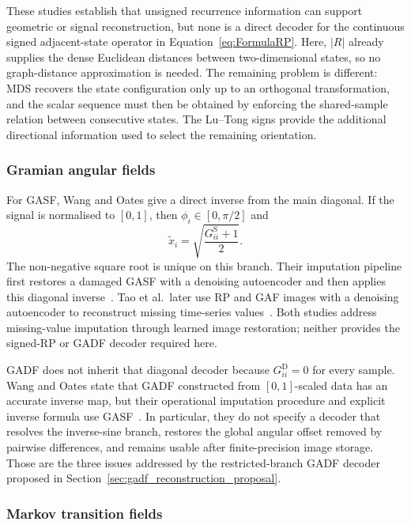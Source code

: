 \documentclass[preprint,12pt]{elsarticle}
\begin{document}
These studies establish that unsigned recurrence information can support geometric or signal reconstruction, but none is a direct decoder for the continuous signed adjacent-state operator in Equation~\ref{eq:FormulaRP}. Here, \(\lvert R\rvert\) already supplies the dense Euclidean distances between two-dimensional states, so no graph-distance approximation is needed. The remaining problem is different: MDS recovers the state configuration only up to an orthogonal transformation, and the scalar sequence must then be obtained by enforcing the shared-sample relation between consecutive states. The Lu--Tong signs provide the additional directional information used to select the remaining orientation.

\subsubsection{Gramian angular fields}

For GASF, Wang and Oates give a direct inverse from the main diagonal. If the signal is normalised to \([0,1]\), then \(\phi_i\in[0,\pi/2]\) and
\[
\tilde{x}_i=\sqrt{\frac{G^{\mathrm{S}}_{ii}+1}{2}}.
\]
The non-negative square root is unique on this branch. Their imputation pipeline first restores a damaged GASF with a denoising autoencoder and then applies this diagonal inverse~\cite{wang2015encoding}. Tao et al.\ later use RP and GAF images with a denoising autoencoder to reconstruct missing time-series values~\cite{huamin2020reconstruction}. Both studies address missing-value imputation through learned image restoration; neither provides the signed-RP or GADF decoder required here.

GADF does not inherit that diagonal decoder because \(G^{\mathrm{D}}_{ii}=0\) for every sample. Wang and Oates state that GADF constructed from \([0,1]\)-scaled data has an accurate inverse map, but their operational imputation procedure and explicit inverse formula use GASF~\cite{wang2015encoding}. In particular, they do not specify a decoder that resolves the inverse-sine branch, restores the global angular offset removed by pairwise differences, and remains usable after finite-precision image storage. Those are the three issues addressed by the restricted-branch GADF decoder proposed in Section~\ref{sec:gadf_reconstruction_proposal}.

\subsubsection{Markov transition fields}
\end{document}
